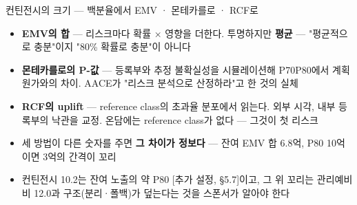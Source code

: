 \begin{frame}{컨틴전시의 크기 — 백분율에서 EMV · 몬테카를로 · RCF로}
\begin{itemize}
\item \textbf{EMV의 합} — 리스크마다 확률 × 영향을 더한다. 투명하지만 \textbf{평균} — "평균적으로 충분"이지 "80\% 확률로 충분"이 아니다
\item \textbf{몬테카를로의 P-값} — 등록부와 추정 불확실성을 시뮬레이션해 P70\til{}P80에서 계획 원가와의 차이. AACE가 "리스크 분석으로 산정하라"고 한 것의 실체
\item \textbf{RCF의 uplift} — reference class의 초과율 분포에서 읽는다. 외부 시각, 내부 등록부의 낙관을 교정. 온담에는 reference class가 없다 — 그것이 첫 리스크
\item 세 방법이 다른 숫자를 주면 \textbf{그 차이가 정보다} — 잔여 EMV 합 6.8억, P80 10억이면 3억의 간격이 꼬리
\item 컨틴전시 10.2는 잔여 노출의 약 P80 [추가 설정, §5.7]이고, 그 위 꼬리는 관리예비비 12.0과 구조(분리·폴백)가 덮는다는 것을 스폰서가 알아야 한다
\end{itemize}
\end{frame}

